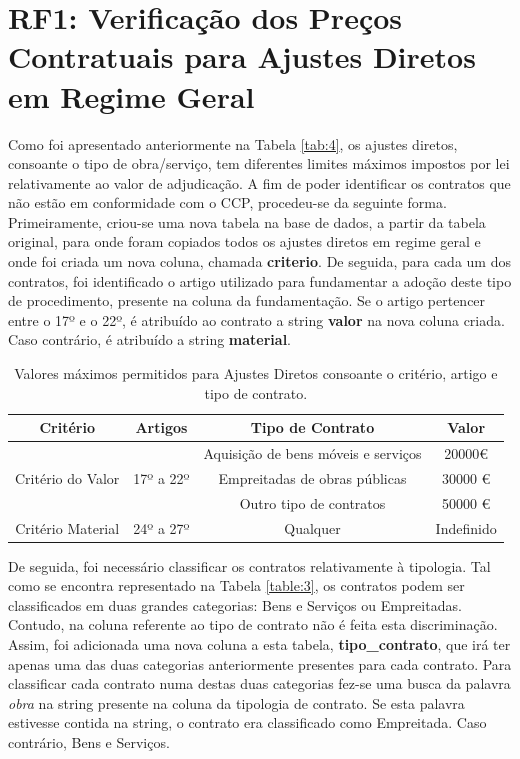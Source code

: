 \section{RF1: Verificação dos Preços Contratuais para Ajustes Diretos em Regime Geral}


Como foi apresentado anteriormente na Tabela \ref{tab:4}, os ajustes diretos, consoante o tipo de obra/serviço, tem diferentes limites máximos impostos por lei relativamente ao valor de adjudicação. A fim de poder identificar os contratos que não estão em conformidade com o CCP, procedeu-se da seguinte forma. Primeiramente, criou-se uma nova tabela na base de dados, a partir da tabela original, para onde foram copiados todos os ajustes diretos em regime geral e onde foi criada um nova coluna, chamada \textbf{criterio}. De seguida, para cada um dos contratos, foi identificado o artigo utilizado para fundamentar a adoção deste tipo de procedimento, presente na coluna da fundamentação. Se o artigo pertencer entre o 17º e o 22º, é atribuído ao contrato a string \textbf{valor} na nova coluna criada. Caso contrário, é atribuído a string \textbf{material}. 

 \begin{table}[H]
 	\centering
 	\begin{tabular}{|c|c|c|c|}
 		\hline
 		\textbf{Critério}                  & \textbf{Artigos}           & \textbf{Tipo de Contrato}           & \textbf{Valor} \\ \hline
 		\multirow{3}{*}{Critério do Valor} & \multirow{3}{*}{17º a 22º} & Aquisição de bens móveis e serviços & 20000€         \\ \cline{3-4} 
 		&                            & Empreitadas de obras públicas       & 30000 €        \\ \cline{3-4} 
 		&                            & Outro tipo de contratos             & 50000 €        \\ \hline
 		Critério Material                  & 24º a 27º                  & Qualquer                            & Indefinido     \\ \hline
 	\end{tabular}
 	\caption{Valores máximos permitidos para Ajustes Diretos consoante o critério, artigo e tipo de contrato.}
 \end{table}

De seguida, foi necessário classificar os contratos relativamente à tipologia. Tal como se encontra representado na Tabela \ref{table:3}, os contratos podem ser classificados em duas grandes categorias: Bens e Serviços ou Empreitadas. Contudo, na coluna referente ao tipo de contrato não é feita esta discriminação. Assim, foi adicionada uma nova coluna a esta tabela, \textbf{tipo\_contrato}, que irá ter apenas uma das duas categorias anteriormente presentes para cada contrato. Para classificar cada contrato numa destas duas categorias fez-se uma busca da palavra \textit{obra} na string presente na coluna da tipologia de contrato. Se esta palavra estivesse contida na string, o contrato era classificado como Empreitada. Caso contrário, Bens e Serviços. 


